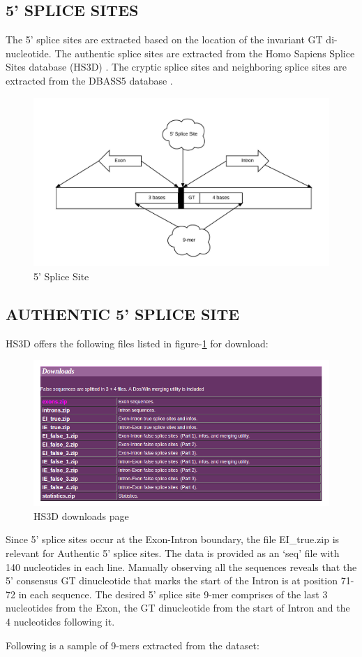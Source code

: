 \documentclass[12pt,a4paper]{article}
\begin{document}
    \subsection{5' SPLICE SITES}
    The 5’ splice sites are extracted based on the location of the invariant GT di-nucleotide. The authentic splice sites are extracted from the Homo Sapiens Splice Sites database (HS3D) \cite{hs3d-1,hs3d-2}. The cryptic splice sites and neighboring splice sites are extracted from the DBASS5 database \cite{dbass-0, dbass3}.
   	\begin{figure}[h]
   		\includegraphics[width=\textwidth]{fiveprime}
   		\caption{5' Splice Site}
   		\centering
   	\end{figure}

	\subsection{AUTHENTIC 5' SPLICE SITE}
	HS3D offers the following files listed in figure-\ref{fig:hs3d_download} for download:
   	\begin{figure}[H]
   		\includegraphics[width=\textwidth]{"hs3d_download"}
   		\caption{HS3D downloads page}
   		\centering
   		\label{fig:hs3d_download}
   	\end{figure}
	\par Since 5’ splice sites occur at the Exon-Intron boundary, the file EI\_true.zip is relevant for Authentic 5’ splice sites. The data is provided as an ‘seq’ file with 140 nucleotides in each line. Manually observing all the sequences reveals that the 5’ consensus GT dinucleotide that marks the start of the Intron is at position 71-72 in each sequence. The desired 5’ splice site 9-mer comprises of the last 3 nucleotides from the Exon, the GT dinucleotide from the start of Intron and the 4 nucleotides following it. \par
	Following is a sample of 9-mers extracted from the dataset:
	
\end{document}
